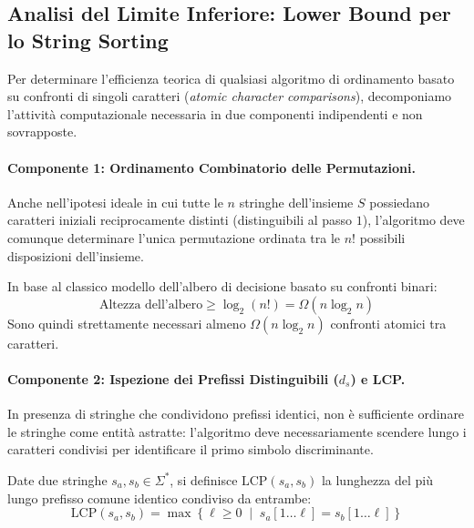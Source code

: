 \FloatBarrier
\subsection{Analisi del Limite Inferiore: Lower Bound per lo String Sorting}
\label{subsec:lower-bound-analysis}

Per determinare l'efficienza teorica di qualsiasi algoritmo di ordinamento basato su confronti di singoli caratteri (\textit{atomic character comparisons}), decomponiamo l'attivit\`a computazionale necessaria in due componenti indipendenti e non sovrapposte.

\paragraph{Componente 1: Ordinamento Combinatorio delle Permutazioni.}
Anche nell'ipotesi ideale in cui tutte le $n$ stringhe dell'insieme $S$ possiedano caratteri iniziali reciprocamente distinti (distinguibili al passo $1$), l'algoritmo deve comunque determinare l'unica permutazione ordinata tra le $n!$ possibili disposizioni dell'insieme. 

In base al classico modello dell'albero di decisione basato su confronti binari:
\begin{equation}
  \text{Altezza dell'albero} \ge \log_2(n!) = \Omega(n \log_2 n)
\end{equation}
Sono quindi strettamente necessari almeno $\Omega(n \log_2 n)$ confronti atomici tra caratteri.

\paragraph{Componente 2: Ispezione dei Prefissi Distinguibili ($d_s$) e LCP.}
In presenza di stringhe che condividono prefissi identici, non \`e sufficiente ordinare le stringhe come entit\`a astratte: l'algoritmo deve necessariamente scendere lungo i caratteri condivisi per identificare il primo simbolo discriminante.

\begin{definition}
Date due stringhe $s_a, s_b \in \Sigma^*$, si definisce $\text{LCP}(s_a, s_b)$ la lunghezza del pi\`u lungo prefisso comune identico condiviso da entrambe:
\begin{equation}
  \text{LCP}(s_a, s_b) = \max \left\{ \ell \ge 0 \;\middle|\; s_a[1 \dots \ell] = s_b[1 \dots \ell] \right\}
\end{equation}
\end{definition}

